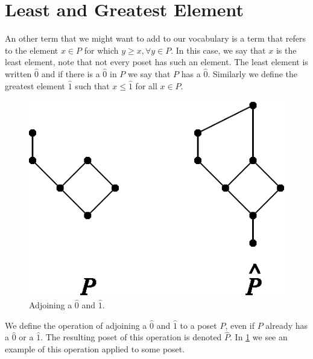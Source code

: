 \section{Least and Greatest Element}
\label{tree:poset:leastandgreatest}

An other term that we might want to add to our vocabulary is a term that refers
to the element $x \in P$ for which $y \geq x, \forall y \in P$. In this case,
we say that $x$ is the least element, note that not every poset has such an
element. The least element is written $\hat{0}$ and if there is a $\hat{0}$ in
$P$ we say that $P$ has a $\hat{0}$. Similarly we define the greatest element
$\hat{1}$ such that $x \leq \hat{1}$ for all $x \in P$.

\begin{figure}
	\centering
	\includegraphics[height=0.2\textheight]{fig/stanley/3-3}
	\caption{\label{fig:stanley:3-3} Adjoining a $\hat{0}$ and $\hat{1}$.
\cite{Stanley:2011:ECV:2124415}}
\end{figure}

We define the operation of adjoining a $\hat{0}$ and $\hat{1}$ to a poset $P$,
even if $P$ already has a $\hat{0}$ or a $\hat{1}$. The resulting poset of this
operation is denoted $\hat{P}$. In \ref{fig:stanley:3-3} we see an example of
this operation applied to some poset.



